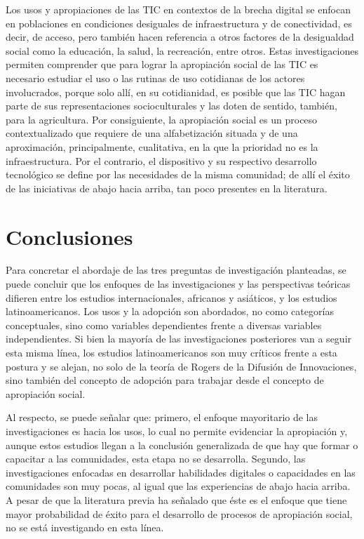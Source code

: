 \documentclass[spanish]{textolivre}
\begin{document}
Los usos y apropiaciones de las TIC en contextos de la brecha digital se enfocan en poblaciones en condiciones desiguales de infraestructura y de conectividad, es decir, de acceso, pero también hacen referencia a otros factores de la desigualdad social como la educación, la salud, la recreación, entre otros. Estas investigaciones permiten comprender que para lograr la apropiación social de las TIC es necesario estudiar el uso o las rutinas de uso cotidianas de los actores involucrados, porque solo allí, en su cotidianidad, es posible que las TIC hagan parte de sus representaciones socioculturales y las doten de sentido, también, para la agricultura. Por consiguiente, la apropiación social es un proceso contextualizado que requiere de una alfabetización situada y de una aproximación, principalmente, cualitativa, en la que la prioridad no es la infraestructura. Por el contrario, el dispositivo y su respectivo desarrollo tecnológico se define por las necesidades de la misma comunidad; de allí el éxito de las iniciativas de abajo hacia arriba, tan poco presentes en la literatura. 

\section{Conclusiones}

Para concretar el abordaje de las tres preguntas de investigación planteadas, se puede concluir que los enfoques de las investigaciones y las perspectivas teóricas difieren entre los estudios internacionales, africanos y asiáticos, y los estudios latinoamericanos. Los usos y la adopción son abordados, no como categorías conceptuales, sino como variables dependientes frente a diversas variables independientes. Si bien la mayoría de las investigaciones posteriores van a seguir esta misma línea, los estudios latinoamericanos son muy críticos frente a esta postura y se alejan, no solo de la teoría de Rogers de la Difusión de Innovaciones, sino también del concepto de adopción para trabajar desde el concepto de apropiación social.

Al respecto, se puede señalar que: primero, el enfoque mayoritario de las investigaciones es hacia los usos, lo cual no permite evidenciar la apropiación y, aunque estos estudios llegan a la conclusión generalizada de que hay que formar o capacitar a las comunidades, esta etapa no se desarrolla. Segundo, las investigaciones enfocadas en desarrollar habilidades digitales o capacidades en las comunidades son muy pocas, al igual que las experiencias de abajo hacia arriba. A pesar de que la literatura previa ha señalado que éste es el enfoque que tiene mayor probabilidad de éxito para el desarrollo de procesos de apropiación social, no se está investigando en esta línea.
\end{document}

